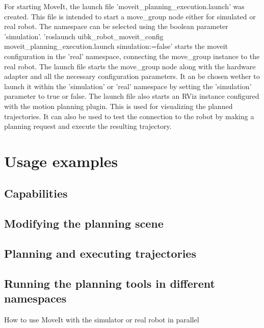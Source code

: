For starting MoveIt, the launch file 'moveit\_planning\_execution.launch' was created. This file is intended to start a move\_group node either for simulated or real robot. The namespace can be selected using the boolean parameter ’simulation’. 'roslaunch uibk\_robot\_moveit\_config moveit\_planning\_execution.launch simulation:=false' starts the moveit configuration in the 'real' namespace, connecting the move\_group instance to the real robot. The launch file starts the move\_group node along with the hardware adapter and all the necessary configuration parameters. It an be chosen wether to launch it within the 'simulation' or 'real' namespace by setting the 'simulation' parameter to true or false. The launch file also starts an RViz instance configured with the motion planning plugin. This is used for visualizing the planned trajectories. It can also be used to test the connection to the robot by making a planning request and execute the resulting trajectory.


\section{Usage examples} 

\subsection{Capabilities}

\subsection{Modifying the planning scene}

\subsection{Planning and executing trajectories}

\subsection{Running the planning tools in different namespaces}
How to use MoveIt with the simulator or real robot in parallel